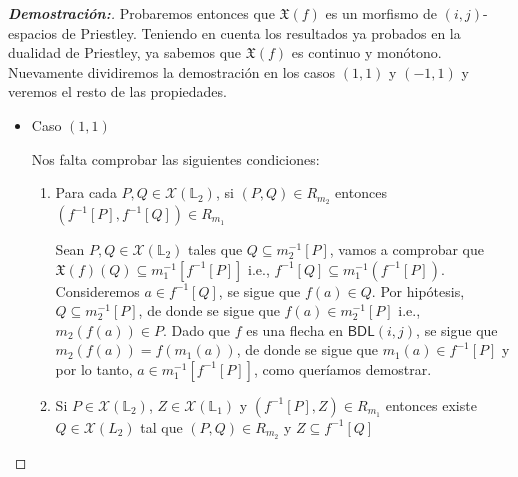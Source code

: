 \documentclass[12pt]{book}
\newcommand{\BDL}{\mathsf{BDL}}
\begin{document}
\begin{proof}[{\textbf{Demostración:}}]Probaremos entonces que $\mathfrak{X}(f)$ es un morfismo de $(i,j)$-espacios de Priestley. Teniendo en cuenta los resultados ya probados en la dualidad de Priestley, ya sabemos que $\mathfrak{X}(f)$ es continuo y monótono. Nuevamente dividiremos la demostración en los casos $(1,1)$ y $(-1,1)$ y veremos el resto de las propiedades.

\begin{itemize}
    \item Caso $(1,1)$

Nos falta comprobar las siguientes condiciones:
\begin{enumerate}
    \item Para cada $P,Q \in \mathcal{X}(\mathbb{L}_{2})$, si $(P,Q) \in R_{m_2}$ entonces $(f^{-1}[P], f^{-1}[Q]) \in R_{m_1}$

\vspace{0.2cm}

Sean $P,Q \in \mathcal{X}(\mathbb{L}_{2})$ tales que $Q \subseteq m_{2}^{-1}[P]$, vamos a comprobar que $\mathfrak{X}(f)(Q) \subseteq m_{1}^{-1}\left[ f^{-1}[P] \right]$ i.e., $f^{-1}[Q] \subseteq m_{1}^{-1}\left(f^{-1}[P]\right)$. Consideremos $a \in f^{-1}[Q]$, se sigue que $f(a) \in Q$. Por hipótesis, $Q \subseteq m_{2}^{-1}[P]$, de donde se sigue que $f(a) \in m_{2}^{-1}[P]$ i.e., $m_{2}(f(a)) \in P$. Dado que $f$ es una flecha en $\BDL(i,j)$, se sigue que $m_{2}(f(a)) = f(m_{1}(a))$, de donde se sigue que $m_{1}(a) \in f^{-1}[P]$ y por lo tanto, $a \in m_{1}^{-1}[f^{-1}[P]]$, como queríamos demostrar.

\vspace{0.2cm}

    \item Si $P \in \mathcal{X}(\mathbb{L}_{2})$, $Z \in \mathcal{X}(\mathbb{L}_{1})$ y $(f^{-1}[P], Z) \in R_{m_1} $ entonces existe $Q \in \mathcal{X}(L_2)$ tal que $ (P,Q) \in R_{m_2}$ y $Z \subseteq f^{-1}[Q]$

\vspace{0.2cm}


\end{enumerate}
\end{itemize}
\end{proof}
\end{document}
